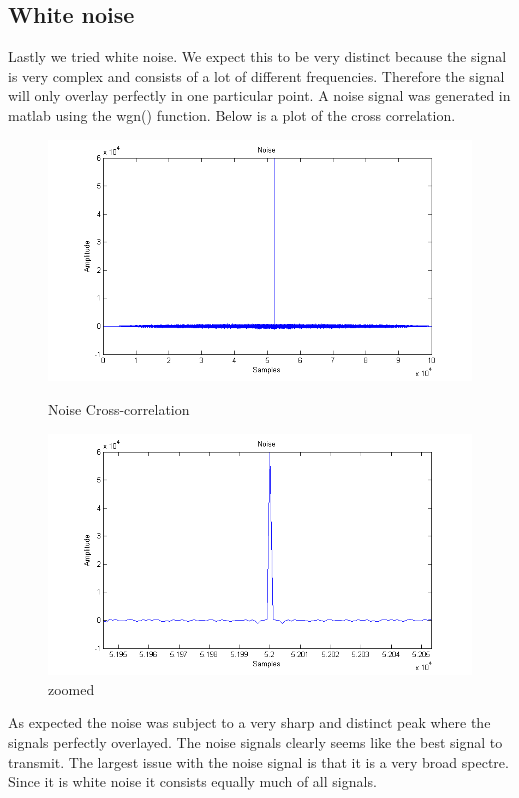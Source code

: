 \subsection{White noise}
Lastly we tried white noise. We expect this to be very distinct because the signal is very complex and consists of a lot of different frequencies. Therefore the signal will only overlay perfectly in one particular point. A noise signal was generated in matlab using the wgn() function. Below is a plot of the cross correlation.\\
\begin{figure}[H]
\begin{minipage}[b]{0.49\linewidth}
\centering
\includegraphics[width=1\textwidth]{billeder/noise_xcorr_fig}
\caption{Noise Cross-correlation}
\label{fig:figure1}
\end{minipage}
\hspace{0.5cm}
\begin{minipage}[b]{0.49\linewidth}
\centering
\includegraphics[width=1\textwidth]{billeder/noise_xcorr_fig_zoom}
\caption{zoomed}
\label{fig:figure2}
\end{minipage}
\end{figure}
As expected the noise was subject to a very sharp and distinct peak where the signals perfectly overlayed. The noise signals clearly seems like the best signal to transmit. The largest issue with the noise signal is that it is a very broad spectre. Since it is white noise it consists equally much of all signals.\\
